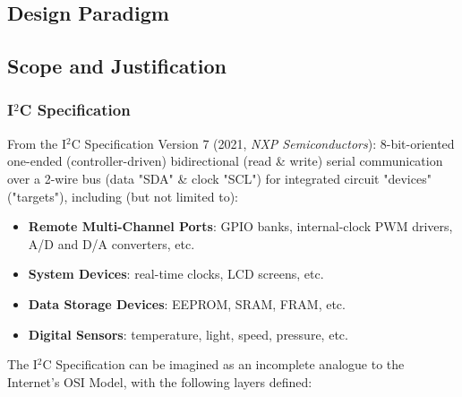 \documentclass{../tex/report}
\begin{document}


\subsection{Design Paradigm}\label{sec:structure}



\clearpage


\subsection{Scope and Justification}\label{sec:scope}

\subsubsection{I${}^2$C Specification}

From the I${}^2$C Specification Version 7 (2021, \textit{NXP Semiconductors}): 8-bit-oriented one-ended (controller-driven) bidirectional (read \& write) serial communication over a 2-wire bus (data "SDA" \& clock "SCL") for integrated circuit "devices" ("targets"), including (but not limited to):

\begin{itemize}
    \item \textbf{Remote Multi-Channel Ports}: GPIO banks, internal-clock PWM drivers, A/D and D/A converters, etc.
    \item \textbf{System Devices}: real-time clocks, LCD screens, etc.
    \item \textbf{Data Storage Devices}: EEPROM, SRAM, FRAM, etc.
    \item \textbf{Digital Sensors}: temperature, light, speed, pressure, etc.
\end{itemize}

The I${}^2$C Specification can be imagined as an incomplete analogue to the Internet's OSI Model, with the following layers defined:
\end{document}
